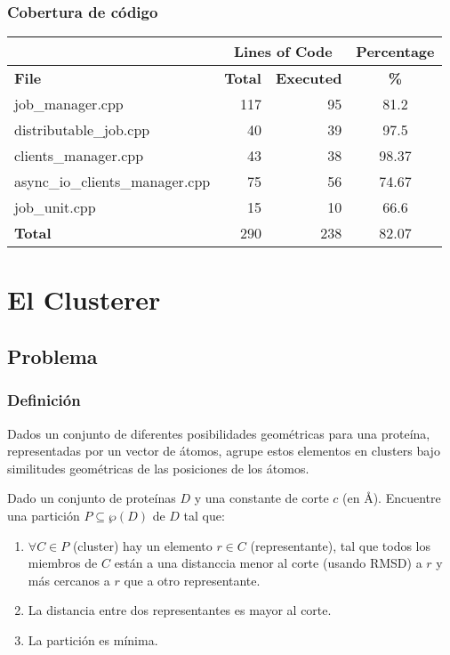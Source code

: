 \documentclass[xcolor=pdftex,dvipsnames,table,10pt,babel,spanish]{beamer}
\begin{document}
  \begin{frame}
    \frametitle{Cobertura de c\'odigo}
  \begin{center}
    \begin{tabular}{|l|r|r|c|}
    \hline
    & \multicolumn{2}{|c|}{Lines of Code} & Percentage \\
    \hline
    \textbf{File} & \textbf{Total} & \textbf{Executed} & \textbf{\%} \\
    \hline
    \scriptsize{job\_manager.cpp} & 117 & 95 & 81.2 \\
    \hline 
    \scriptsize{distributable\_job.cpp} & 40 & 39 & 97.5 \\
    \hline 
    \scriptsize{clients\_manager.cpp} & 43 & 38 & 98.37 \\
    \hline 
    \scriptsize{async\_io\_clients\_manager.cpp} & 75 & 56 & 74.67 \\
    \hline 
    \scriptsize{job\_unit.cpp} & 15 & 10 & 66.6 \\
    \hline 
    \textbf{Total} & 290 & 238 & 82.07 \\
    \hline 
    \end{tabular}
  \end{center}
  
  \end{frame}

\section{El Clusterer}

\subsection{Problema}

\begin{frame}
 \frametitle{Definici\'on}

\begin{block}{}
Dados un conjunto de diferentes posibilidades geom\'etricas para una prote\'ina, representadas por un vector de \'atomos, agrupe estos elementos en clusters bajo similitudes geom\'etricas de las posiciones de los \'atomos.
\end{block}

\pause

\begin{block}{}
Dado un conjunto de prote\'inas $D$ y una constante de corte $c$ (en \AA{}). Encuentre una partici\'on $P \subseteq \wp(D)$ de $D$ tal que:
\begin{enumerate}
\item $\forall C \in P$ (cluster) hay un elemento $r \in C$ (representante), tal que todos los miembros de $C$ est\'an a una distanccia menor al corte (usando RMSD) a $r$ y m\'as cercanos a $r$ que a otro representante.
\pause
\item La distancia entre dos representantes es mayor al corte.
\pause
\item La partici\'on es m\'inima.
\end{enumerate}
\end{block}

\end{frame}
\end{document}

